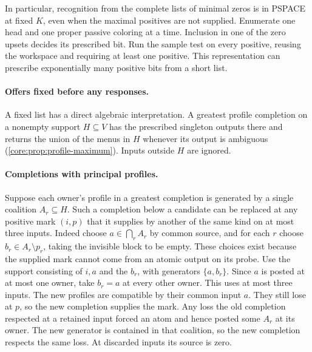 In particular, recognition from the complete lists of minimal zeros is
in PSPACE at fixed $K$, even when the maximal positives are not supplied.
Enumerate one head and one proper passive coloring at a time. Inclusion
in one of the zero upsets decides its prescribed bit. Run the sample
test on every positive, reusing the workspace and requiring at least
one positive. This representation can prescribe exponentially many
positive bits from a short list.



\paragraph{Offers fixed before any responses.}
A fixed list has a direct algebraic interpretation. A greatest profile
completion on a nonempty support $H\subseteq V$ has the prescribed
singleton outputs there and returns the union of the menus in $H$
whenever its output is ambiguous (\cref{core:prop:profile-maximum}).
Inputs outside $H$ are ignored.

\paragraph{Completions with principal profiles.}
Suppose each owner's profile in a greatest completion is generated
by a single coalition $A_r\subseteq H$. Such a completion below a
candidate can be replaced at any positive mark $(i,p)$ that it
supplies by another of the same kind on at most three inputs.
Indeed choose $a\in\bigcap_r A_r$ by common source, and for each
$r$ choose $b_r\in A_r\setminus p_r$, taking the invisible block
to be empty. These choices exist because the supplied mark cannot
come from an atomic output on its probe. Use the support consisting
of $i,a$ and the $b_r$, with generators $\{a,b_r\}$.
Since $a$ is posted at at most one owner, take $b_r=a$
at every other owner. This uses at most three inputs.
The new profiles are compatible by their common input $a$. They
still lose at $p$, so the new completion supplies the mark.
Any loss the old completion respected at a retained input forced
an atom and hence posted some $A_r$ at its owner. The new generator
is contained in that coalition, so the new completion respects
the same loss. At discarded inputs its source is zero.

